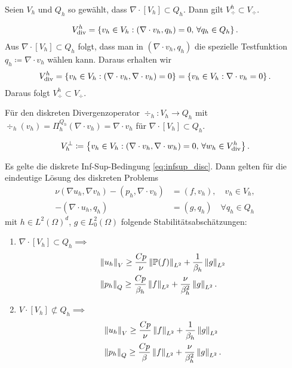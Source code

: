 \begin{bemerkung} %
  Seien $V_{h}$ und $Q_{h}$ so gewählt, dass $\nabla\cdot [V_{h}] \subset Q_{h}$. Dann gilt  $V_{\div}^{h}\subset V_{\div}$.
  \begin{beweis}
    \begin{align*}
      V_{\operatorname{div}}^{h} = \left\{ v_{h} \in V_{h}: (\nabla\cdot v_{h}, q_{h}) = 0, \, \forall q_{h} \in Q_{h} \right\}. 
    \end{align*}
Aus $\nabla\cdot [V_{h}] \subset Q_{h}$ folgt, dass man in $(\nabla\cdot v_{h}, q_{h})$ die spezielle Testfunktion $q_{h}\coloneqq \nabla\cdot v_{h}$ wählen kann. Daraus erhalten wir
\begin{align*}
        V_{\operatorname{div}}^{h} = \left\{ v_{h} \in V_{h}: (\nabla\cdot v_{h}, \nabla\cdot v_{h}) = 0 \right\} = \left\{ v_{h} \in V_{h}: \nabla\cdot v_{h}= 0 \right\}. 
\end{align*}
Daraus folgt $V_{\div}^{h}\subset V_{\div}$.
  \end{beweis}
Für den diskreten Divergenzoperator $\div_{h}: V_{h} \to Q_{h}$ mit $\div_{h}(v_{h}) = \Pi_{h}^{Q_{h}}(\nabla\cdot v_{h}) = \nabla\cdot v_{h}$ für $\nabla\cdot [V_{h}] \subset Q_{h}$.
\end{bemerkung}
\begin{definition}
  \begin{align*}
    V_h^{\perp}\coloneqq \left\{ v_{h} \in V_{h}: (\nabla\cdot v_{h}, \nabla\cdot w_{h}) = 0, \, \forall w_{h} \in V^{h}_{\operatorname{div}} \right\}. 
  \end{align*}
\end{definition}
\begin{lemma}
  Es gelte die diskrete Inf-Sup-Bedingung \eqref{eq:infsup_disc}. Dann gelten für die eindeutige Lösung des diskreten Problems
  \begin{align*}
    \nu(\nabla u_{h}, \nabla v_{h}) - (p_{h}, \nabla\cdot v_{h}) &= (f, v_{h}), \quad v_{h}\in V_{h}, \\
- (\nabla \cdot u_{h}, q_{h}) &= (g, q_{h}) \quad \forall q_{h}\in Q_{h}
  \end{align*}
mit $h \in L^{2}(\Omega)^{d}$, $g \in L_{0}^{2}(\Omega)$ folgende Stabilitätsabschätzungen:
\begin{enumerate}
\item $\nabla\cdot [V_{h}] \subset Q_{h} \implies $
  \begin{align*}
&    \left \|u_{h} \right\|_{V} \geq \frac {Cp} \nu \left \|\mathbb{P}(f) \right\|_{L^{2}} + \frac 1 {\beta_{h}}\left \|g \right\|_{L^{2}}\\
&    \left \|p_{h} \right\|_{Q} \geq \frac {Cp} {\beta_{h}} \left \|f \right\|_{L^{2}} + \frac \nu {\beta^{2}_{h}}\left \|g \right\|_{L^{2}}. 
  \end{align*}
\item $V\cdot[V_{h}]\not \subset Q_{h} \implies$
  \begin{align*}
    &    \left \|u_{h} \right\|_{V} \geq \frac {Cp} \nu \left \|f \right\|_{L^{2}} + \frac 1 {\beta_{h}}\left \|g \right\|_{L^{2}}\\
    &    \left \|p_{h} \right\|_{Q} \geq \frac {Cp} {\beta} \left \|f \right\|_{L^{2}} + \frac \nu {\beta^{2}_{h}}\left \|g \right\|_{L^{2}}. 
  \end{align*}
\end{enumerate}
\end{lemma}
